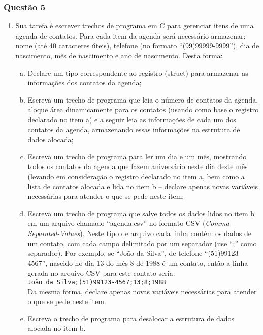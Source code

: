 \documentclass[aspectratio=169]{beamer}
\newcommand\setItemnumber[1]{\setcounter{enumi}{\numexpr#1-1\relax}}
\begin{document}
\begin{frame}\frametitle{Questão 5}
{\scriptsize
\begin{enumerate}
\setItemnumber{5}
\item Sua tarefa é escrever trechos de programa em C para gerenciar itens de uma agenda de contatos. Para cada item da agenda será necessário armazenar: nome (até 40 caracteres úteis), telefone (no formato ``(99)99999-9999''), dia de nascimento, mês de nascimento e ano de nascimento. Desta forma:
\begin{enumerate}[a)]
\scriptsize
\item Declare um tipo correspondente ao registro (struct) para armazenar as informações dos contatos da agenda;
\item Escreva um trecho de programa que leia o número de contatos da agenda, aloque área dinamicamente para os contatos (usando como base o registro declarado no item a) e a seguir leia as informações de cada um dos contatos da agenda, armazenando essas informações na estrutura de dados alocada;
\item Escreva um trecho de programa para ler um dia e um mês, mostrando todos os contatos da agenda que fazem aniversário neste dia deste mês (levando em consideração o registro declarado no item a, bem como a lista de contatos alocada e lida no item b -- declare apenas novas variáveis necessárias para atender o que se pede neste item;
\item Escreva um trecho de programa que salve todos os dados lidos no item b em um arquivo chamado ``agenda.csv'' no formato CSV (\emph{Comma-Separated-Values}). Neste tipo de arquivo cada linha contém os dados de um contato, com cada campo delimitado por um separador (use ``;'' como separador). Por exemplo, se ``João da Silva'', de telefone ``(51)99123-4567'', nascido no dia 13 do mês 8 de 1988 é um contato, então a linha gerada no arquivo CSV para este contato seria:\\
\texttt{João da Silva;(51)99123-4567;13;8;1988}\\
Da mesma forma, declare apenas novas variáveis necessárias para atender o que se pede neste item.
\item Escreva o trecho de programa para desalocar a estrutura de dados alocada no item b.
\end{enumerate}
\end{enumerate}
}
\end{frame}
\end{document}
